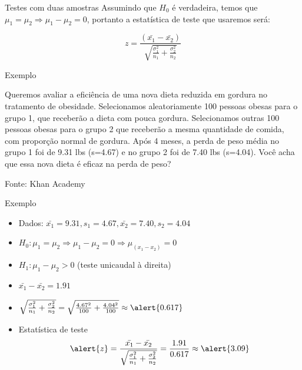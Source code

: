 \documentclass{beamer}
\begin{document}
\begin{frame}{Testes com duas amostras}
  Assumindo que $H_0$ é verdadeira, temos que $\mu_1=\mu_2 \Rightarrow
  \mu_1-\mu_2 = 0$, portanto a estatística de teste que usaremos será:

\begin{displaymath}
  z = \frac{ (\bar{x_1} - \bar{x_2}) }{\sqrt{\frac{\sigma_1^2}{n_1} + \frac{\sigma^2_2}{n_2}}}
\end{displaymath}

\end{frame}

\begin{frame}{Exemplo}
  \begin{example}
    Queremos avaliar a eficiência de uma nova dieta reduzida em
    gordura no tratamento de obesidade. Selecionamos aleatoriamente
    100 pessoas obesas para o grupo 1, que receberão a dieta com pouca
    gordura. Selecionamos outras 100 pessoas obesas para o grupo 2 que
    receberão a mesma quantidade de comida, com proporção normal de
    gordura. Após 4 meses, a perda de peso média no grupo 1 foi de
    9.31 lbs (s=4.67) e no grupo 2 foi de 7.40 lbs (s=4.04). Você acha
    que essa nova dieta é eficaz na perda de peso?
  \end{example}
  Fonte: Khan Academy
\end{frame}

\begin{frame}{Exemplo}
  \begin{example}
    \begin{itemize}
    \item Dados: $\bar{x_1}=9.31, s_1=4.67, \bar{x_2}=7.40, s_2 = 4.04$
    \item $H_0: \mu_1 = \mu_2 \Rightarrow \mu_1 - \mu_2 = 0 \Rightarrow \mu_{(x_1 - x_2)} = 0$
    \item $H_1: \mu_1 - \mu_2 > 0$ (teste unicaudal à direita)
    \item $\bar{x_1}-\bar{x_2}=1.91$
    \item $\sqrt{\frac{\sigma_1^2}{n_1} + \frac{\sigma^2_2}{n_2}} =
      \sqrt{\frac{4.67^2}{100} + \frac{4.04^2}{100}} \approx \alert{0.617}$
    \item Estatística de teste
      \begin{displaymath}
        \alert{z} = \frac{\bar{x_1}-\bar{x_2}}{\sqrt{\frac{\sigma_1^2}{n_1} +
            \frac{\sigma^2_2}{n_2}}} = \frac{1.91}{0.617} \approx \alert{3.09}
      \end{displaymath}
    \end{itemize}
  \end{example}
\end{frame}
\end{document}
